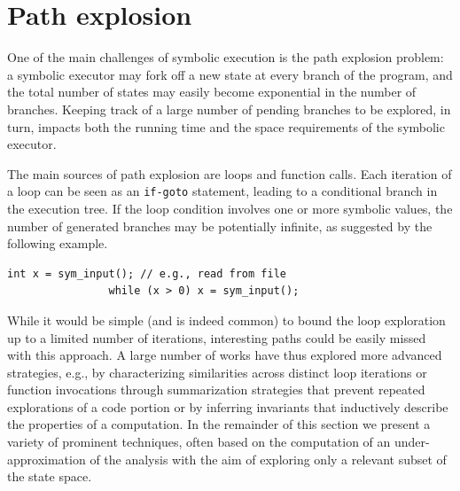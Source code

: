 
\section{Path explosion}
\label{se:path-explosion}

One of the main challenges of symbolic execution is the path explosion problem: a symbolic executor may fork off a new state at every branch of the program, and the total number of states may easily become exponential in the number of branches. Keeping track of a large number of pending branches to be explored, in turn, impacts both the running time and the space requirements of the symbolic executor. 

The main sources of path explosion are loops and function calls. Each iteration of a loop can be seen as an {\tt if-goto} statement, leading to a conditional branch in the execution tree. If the loop condition involves one or more symbolic values, the number of generated branches may be potentially infinite, as suggested by the following example. 

\vspace{-3pt} %
\begin{shaded}
  \vspace{-1mm}
  \begin{lstlisting}[basicstyle=\ttfamily\small]
                int x = sym_input(); // e.g., read from file
                while (x > 0) x = sym_input();  
  \end{lstlisting}
  \vspace{-1mm}
\end{shaded}
\vspace{-3pt} 

While it would be simple (and is indeed common) to bound the loop exploration up to a limited number of iterations, interesting paths could be easily missed with this approach.  A large number of works have thus explored more advanced strategies, e.g., by characterizing similarities across distinct loop iterations or function invocations through summarization strategies that prevent repeated explorations of a code portion or by inferring invariants that inductively describe the properties of a computation. In the remainder of this section we present a variety of prominent techniques, often based on the computation of an under-approximation of the analysis with the aim of exploring only a relevant subset of the state space.

